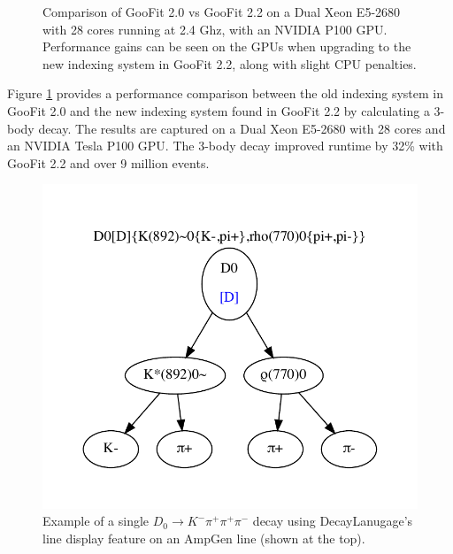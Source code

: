 \documentclass{webofc}
\begin{document}
\begin{figure}[h]
	\centering
	\caption{Comparison of GooFit 2.0 vs GooFit 2.2 on a Dual Xeon E5-2680 with 28 cores running at 2.4 Ghz, with an NVIDIA P100 GPU. Performance gains can be seen on the GPUs when upgrading to the new indexing system in GooFit 2.2, along with slight CPU penalties.}
		\label{figure-newindexspeed}
\end{figure}

Figure \ref{figure-newindexspeed} provides a performance comparison between the old indexing system in GooFit 2.0 and the new indexing system found in GooFit 2.2 by calculating a 3-body decay. The results are captured on a Dual Xeon E5-2680 with 28 cores and an NVIDIA Tesla P100 GPU. The 3-body decay improved runtime by 32\% with GooFit 2.2 and over 9 million events.

\begin{figure}[ht]
	\centering
	\includegraphics[width=.5\textwidth]{LineExample}
	\caption{Example of a single $D_0 \rightarrow K^{-} \pi^{+} \pi^{+} \pi^{-}$ decay using DecayLanugage's line display feature on an AmpGen line (shown at the top).}
		\label{fig-ampgen}
\end{figure}
\end{document}

